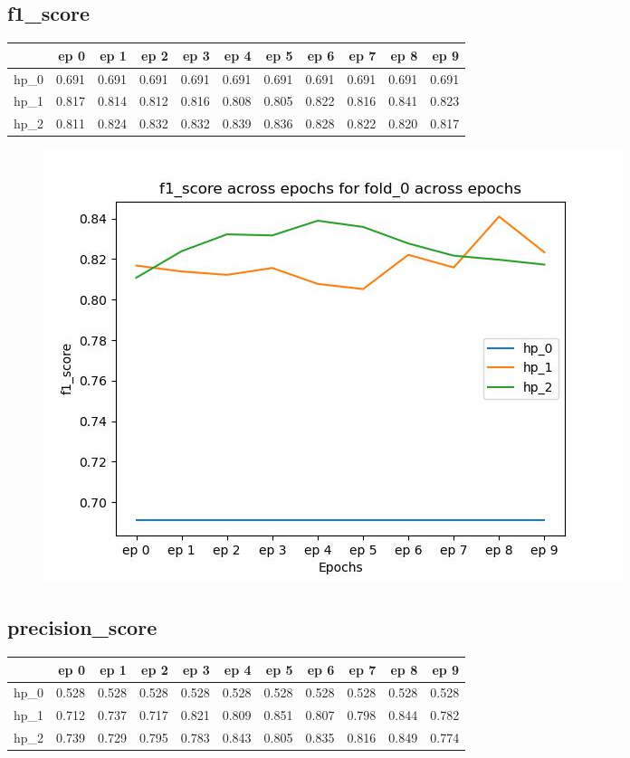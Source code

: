 \documentclass{article}
\begin{document}
\subsection{f1\_score}
\begin{tabular}{lrrrrrrrrrr}
\toprule
{} &   ep 0 &   ep 1 &   ep 2 &   ep 3 &   ep 4 &   ep 5 &   ep 6 &   ep 7 &   ep 8 &   ep 9 \\
\midrule
hp\_0 &  0.691 &  0.691 &  0.691 &  0.691 &  0.691 &  0.691 &  0.691 &  0.691 &  0.691 &  0.691 \\
hp\_1 &  0.817 &  0.814 &  0.812 &  0.816 &  0.808 &  0.805 &  0.822 &  0.816 &  0.841 &  0.823 \\
hp\_2 &  0.811 &  0.824 &  0.832 &  0.832 &  0.839 &  0.836 &  0.828 &  0.822 &  0.820 &  0.817 \\
\bottomrule
\end{tabular}

\begin{figure}[H]
\includegraphics[scale = 0.75]{fold_0/f1_score}
\end{figure}
\subsection{precision\_score}
\begin{tabular}{lrrrrrrrrrr}
\toprule
{} &   ep 0 &   ep 1 &   ep 2 &   ep 3 &   ep 4 &   ep 5 &   ep 6 &   ep 7 &   ep 8 &   ep 9 \\
\midrule
hp\_0 &  0.528 &  0.528 &  0.528 &  0.528 &  0.528 &  0.528 &  0.528 &  0.528 &  0.528 &  0.528 \\
hp\_1 &  0.712 &  0.737 &  0.717 &  0.821 &  0.809 &  0.851 &  0.807 &  0.798 &  0.844 &  0.782 \\
hp\_2 &  0.739 &  0.729 &  0.795 &  0.783 &  0.843 &  0.805 &  0.835 &  0.816 &  0.849 &  0.774 \\
\bottomrule
\end{tabular}
\end{document}
